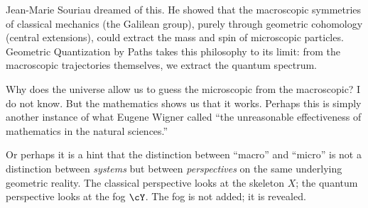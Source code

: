 Jean-Marie Souriau dreamed of this.
He showed that the macroscopic symmetries of classical mechanics
(the Galilean group),
purely through geometric cohomology
(central extensions),
could extract the mass and spin of microscopic particles.
Geometric Quantization by Paths takes this philosophy to its limit:
from the macroscopic trajectories themselves,
we extract the quantum spectrum.

Why does the universe allow us to guess the microscopic
from the macroscopic?
I do not know.
But the mathematics shows us that it works.
Perhaps this is simply another instance
of what Eugene Wigner called
``the unreasonable effectiveness of mathematics
in the natural sciences.''

Or perhaps it is a hint
that the distinction between ``macro'' and ``micro''
is not a distinction between \emph{systems}
but between \emph{perspectives}
on the same underlying geometric reality.
The classical perspective looks at the skeleton $X$;
the quantum perspective looks at the fog $\cY$.
The fog is not added;
it is revealed.
